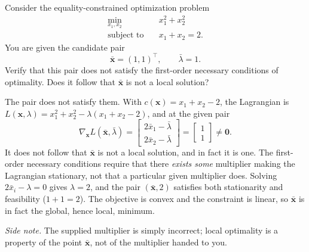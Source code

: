 \begin{exercise} %
    
    Consider the equality-constrained optimization problem
    \[
    \begin{aligned}
        \min_{x_1, x_2} \quad & x_1^2 + x_2^2 \\
        \text{subject to} \quad & x_1 + x_2 = 2.
    \end{aligned}
    \]
    You are given the candidate pair
    \[
        \bar{\mathbf{x}} = (1, 1)^\top, \qquad \bar{\lambda} = 1.
    \]
    Verify that this pair does not satisfy the first-order necessary conditions of optimality. Does it follow that $\bar{\mathbf{x}}$ is not a local solution?
    
\end{exercise}

\begin{solution}
    
    The pair does not satisfy them. With $c(\mathbf{x}) = x_1 + x_2 - 2$, the Lagrangian is $L(\mathbf{x}, \lambda) = x_1^2 + x_2^2 - \lambda(x_1 + x_2 - 2)$, and at the given pair
    \[
        \nabla_{\mathbf{x}} L(\bar{\mathbf{x}}, \bar{\lambda}) = \begin{bmatrix} 2\bar{x}_1 - \bar{\lambda} \\ 2\bar{x}_2 - \bar{\lambda} \end{bmatrix} = \begin{bmatrix} 1 \\ 1 \end{bmatrix} \neq \mathbf{0}.
    \]
    It does not follow that $\bar{\mathbf{x}}$ is not a local solution, and in fact it is one. The first-order necessary conditions require that there \emph{exists some} multiplier making the Lagrangian stationary, not that a particular given multiplier does. Solving $2\bar{x}_i - \lambda = 0$ gives $\lambda = 2$, and the pair $(\bar{\mathbf{x}}, 2)$ satisfies both stationarity and feasibility ($1 + 1 = 2$). The objective is convex and the constraint is linear, so $\bar{\mathbf{x}}$ is in fact the global, hence local, minimum.

    \emph{Side note.} The supplied multiplier is simply incorrect; local optimality is a property of the point $\bar{\mathbf{x}}$, not of the multiplier handed to you.
    
\end{solution}

